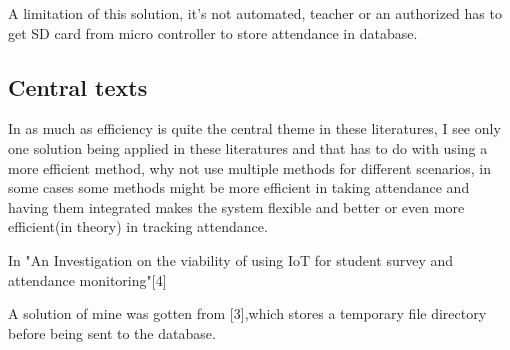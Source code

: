 A limitation of this solution, it's not automated, teacher or an authorized has to get SD card from micro controller to store attendance in database.


\subsection{Central texts}

In as much as efficiency is quite the central theme in these literatures, I see only one solution being applied in these literatures and that has to do with using a more efficient method, why not use multiple methods for different scenarios, in some cases some methods might be more efficient in taking attendance and having them integrated makes the system flexible and better or even more efficient(in theory) in tracking attendance.

In "An Investigation on the viability of using IoT for student survey and attendance monitoring"[4]


A solution of mine was gotten from [3],which stores a temporary file directory before being sent to the database.